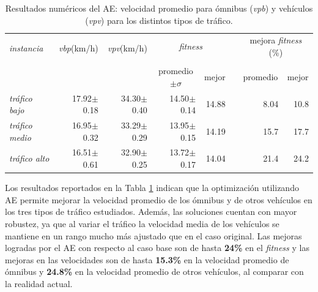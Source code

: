 

\begin{table}[H]
	\renewcommand{\arraystretch}{1.05}
\renewcommand{\tabcolsep}{4pt}
	\caption[Resultados numéricos del caso base.]{Resultados numéricos del AE: velocidad promedio para ómnibus (\textit{vpb}) y vehículos (\textit{vpv}) para los distintos tipos de tráfico.}
	\label{table:resultado_caso_algoritmo}
	\begin{tabular}{lrrrrrrr}
		\toprule
		\multirow{2}{*}{\textit{instancia}}&
		\multirow{2}{*}{\textit{vbp}(km/h)}&
		\multirow{2}{*}{\textit{vpv}(km/h)}&
		\multicolumn{2}{c}{\emph{fitness}}&  &
		\multicolumn{2}{c}{mejora \emph{fitness} (\%)}\\  
		\cline{4-5} \cline{7-8}\\[-9pt]
		&     &     & \multicolumn{1}{c}{promedio$\pm\sigma$} & \multicolumn{1}{c}{mejor} &  & \multicolumn{1}{c}{promedio} & \multicolumn{1}{c}{mejor} \\ 
		\midrule
		\textit{tráfico bajo} & 17.92$\pm$0.18 & 34.30$\pm$0.40 & 14.50$\pm$0.14 & 14.88 & & 8.04 & 10.8  \\
		\textit{tráfico medio} & 16.95$\pm$0.32 & 33.29$\pm$0.29 & 13.95$\pm$0.15 & 14.19 & & 15.7& 17.7\\
		\textit{tráfico alto} & 16.51$\pm$0.61  & 32.90$\pm$0.25& 13.72$\pm$0.17 & 14.04 & & 21.4& 24.2\\    
		\bottomrule        
	\end{tabular}
\end{table}


Los resultados reportados en la Tabla \ref{table:resultado_caso_algoritmo} indican que la optimización utilizando AE permite mejorar la velocidad promedio de los ómnibus y de otros vehículos en los tres tipos de tráfico estudiados. Además, las soluciones cuentan con mayor robustez, ya que al variar el tráfico la velocidad media de los vehículos se mantiene en un rango mucho más ajustado que en el caso original. Las mejoras logradas por el AE con respecto al caso base son de hasta \textbf{24\%} en el \emph{fitness} y las mejoras en las velocidades son de hasta \textbf{15.3\%} en la velocidad promedio de ómnibus y \textbf{24.8\%} en la velocidad promedio de otros vehículos, al comparar con la realidad actual.

